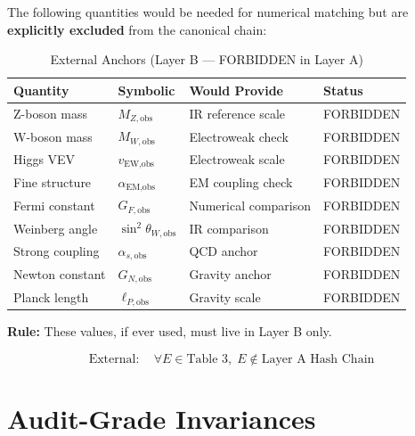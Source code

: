 \documentclass[11pt,a4paper]{article}
\theoremstyle{definition}
\begin{document}
\begin{quarantinebox}
The following quantities would be needed for numerical matching but are
\textbf{explicitly excluded} from the canonical chain:

\begin{table}[h]
\centering
\caption{External Anchors (Layer B --- FORBIDDEN in Layer A)}
\label{tab:external}
\begin{tabular}{@{}llll@{}}
\toprule
\textbf{Quantity} & \textbf{Symbolic} & \textbf{Would Provide} & \textbf{Status} \\
\midrule
Z-boson mass & $M_{Z,\text{obs}}$ & IR reference scale & FORBIDDEN \\
W-boson mass & $M_{W,\text{obs}}$ & Electroweak check & FORBIDDEN \\
Higgs VEV & $v_{\text{EW,obs}}$ & Electroweak scale & FORBIDDEN \\
Fine structure & $\alpha_{\text{EM,obs}}$ & EM coupling check & FORBIDDEN \\
Fermi constant & $G_{F,\text{obs}}$ & Numerical comparison & FORBIDDEN \\
Weinberg angle & $\sin^2\theta_{W,\text{obs}}$ & IR comparison & FORBIDDEN \\
Strong coupling & $\alpha_{s,\text{obs}}$ & QCD anchor & FORBIDDEN \\
Newton constant & $G_{N,\text{obs}}$ & Gravity anchor & FORBIDDEN \\
Planck length & $\ell_{P,\text{obs}}$ & Gravity scale & FORBIDDEN \\
\bottomrule
\end{tabular}
\end{table}

\textbf{Rule:} These values, if ever used, must live in Layer B only.
\end{quarantinebox}

\begin{equation}
\label{eq:external_summary}
\text{External}: \quad \forall E \in \text{Table 3}, \; E \notin \text{Layer A Hash Chain}
\end{equation}

\section{Audit-Grade Invariances}
\label{sec:invariances}
\end{document}

